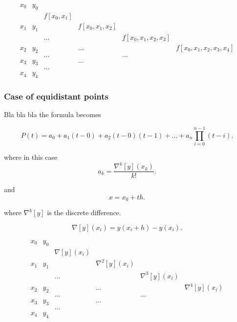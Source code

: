 \documentclass{report}
\begin{document}
\[
	\begin{array}{cccccc}
		x_0 & y_0                                                                             \\
		    &     & f[x_0,x_1]                                                                \\
		x_1 & y_1 &            & f[x_0,x_1,x_2]                                               \\
		    &     & \dots      &                & f[x_0,x_1,x_2,x_3]                          \\
		x_2 & y_2 &            & \dots          &                    & f[x_0,x_1,x_2,x_3,x_4] \\
		    &     & \dots      &                & \dots                                       \\
		x_3 & y_3 &            & \dots                                                        \\
		    &     & \dots                                                                     \\
		x_4 & y_4
	\end{array}
\]

\subsubsection{Case of equidistant points}
Bla bla bla the formula becomes

\[
	P(t) = a_0 + a_1(t-0) + a_2(t-0)(t-1) + \dots + a_n \prod_{i=0}^{n-1}(t-i)
	.\]

where in this case
\[
	a_k = \frac{\nabla^k[y](x_k)}{k!}
	.\]

and
\[
	x = x_0 +th
	.\]

where $\nabla^k[y]$ is the discrete difference.

\[
	\nabla[y](x_i) = y(x_i+h)-y(x_i)
	.\]

\[
	\begin{array}{cccccc}
		x_0 & y_0                                                                           \\
		    &     & \nabla[y](x_i)                                                          \\
		x_1 & y_1 &                & \nabla^2[y](x_i)                                       \\
		    &     & \dots          &                  & \nabla^3[y](x_i)                    \\
		x_2 & y_2 &                & \dots            &                  & \nabla^4[y](x_i) \\
		    &     & \dots          &                  & \dots                               \\
		x_3 & y_3 &                & \dots                                                  \\
		    &     & \dots                                                                   \\
		x_4 & y_4
	\end{array}
\]
\end{document}

